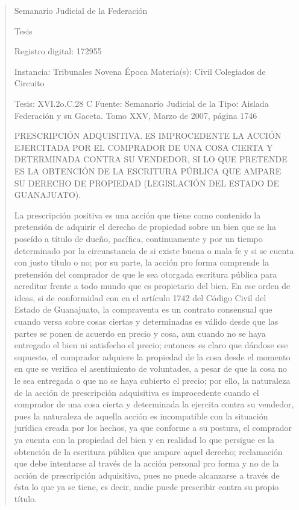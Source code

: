 \documentclass[11pt,a4paper]{article}
\begin{document}
\begin{quote}
                                                   Semanario Judicial de la Federación

                                                  Tesis

 Registro digital: 172955

 Instancia: Tribunales            Novena Época                          Materia(s): Civil
 Colegiados de Circuito

 Tesis: XVI.2o.C.28 C             Fuente: Semanario Judicial de la      Tipo: Aislada
                                  Federación y su Gaceta.
                                  Tomo XXV, Marzo de 2007, página
                                  1746


PRESCRIPCIÓN ADQUISITIVA. ES IMPROCEDENTE LA ACCIÓN EJERCITADA POR EL
COMPRADOR DE UNA COSA CIERTA Y DETERMINADA CONTRA SU VENDEDOR, SI LO QUE
PRETENDE ES LA OBTENCIÓN DE LA ESCRITURA PÚBLICA QUE AMPARE SU DERECHO DE
PROPIEDAD (LEGISLACIÓN DEL ESTADO DE GUANAJUATO).


La prescripción positiva es una acción que tiene como contenido la pretensión de adquirir el derecho
de propiedad sobre un bien que se ha poseído a título de dueño, pacífica, continuamente y por un
tiempo determinado por la circunstancia de si existe buena o mala fe y si se cuenta con justo título o
no; por su parte, la acción pro forma comprende la pretensión del comprador de que le sea otorgada
escritura pública para acreditar frente a todo mundo que es propietario del bien. En ese orden de
ideas, si de conformidad con en el artículo 1742 del Código Civil del Estado de Guanajuato, la
compraventa es un contrato consensual que cuando versa sobre cosas ciertas y determinadas es
válido desde que las partes se ponen de acuerdo en precio y cosa, aun cuando no se haya
entregado el bien ni satisfecho el precio; entonces es claro que dándose ese supuesto, el
comprador adquiere la propiedad de la cosa desde el momento en que se verifica el asentimiento de
voluntades, a pesar de que la cosa no le sea entregada o que no se haya cubierto el precio; por ello,
la naturaleza de la acción de prescripción adquisitiva es improcedente cuando el comprador de una
cosa cierta y determinada la ejercita contra su vendedor, pues la naturaleza de aquella acción es
incompatible con la situación jurídica creada por los hechos, ya que conforme a su postura, el
comprador ya cuenta con la propiedad del bien y en realidad lo que persigue es la obtención de la
escritura pública que ampare aquel derecho; reclamación que debe intentarse al través de la acción
personal pro forma y no de la acción de prescripción adquisitiva, pues no puede alcanzarse a través
de ésta lo que ya se tiene, es decir, nadie puede prescribir contra su propio título.


\end{quote}
\end{document}
